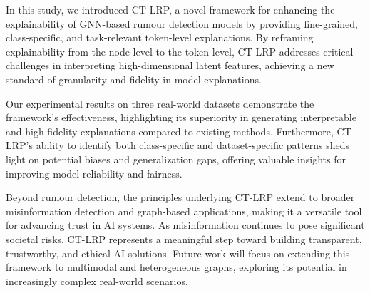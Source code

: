 In this study, we introduced CT-LRP, a novel framework for enhancing the explainability of GNN-based rumour detection models by providing fine-grained, class-specific, and task-relevant token-level explanations. By reframing explainability from the node-level to the token-level, CT-LRP addresses critical challenges in interpreting high-dimensional latent features, achieving a new standard of granularity and fidelity in model explanations.

Our experimental results on three real-world datasets demonstrate the framework's effectiveness, highlighting its superiority in generating interpretable and high-fidelity explanations compared to existing methods. Furthermore, CT-LRP's ability to identify both class-specific and dataset-specific patterns sheds light on potential biases and generalization gaps, offering valuable insights for improving model reliability and fairness.

Beyond rumour detection, the principles underlying CT-LRP extend to broader misinformation detection and graph-based applications, making it a versatile tool for advancing trust in AI systems. As misinformation continues to pose significant societal risks, CT-LRP represents a meaningful step toward building transparent, trustworthy, and ethical AI solutions. Future work will focus on extending this framework to multimodal and heterogeneous graphs, exploring its potential in increasingly complex real-world scenarios.




